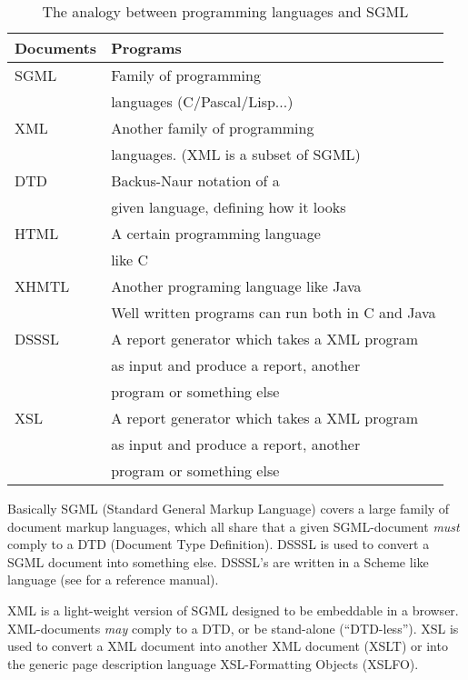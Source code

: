 \begin{table}[htbp]
  \begin{center}
    \begin{tabular}{|l|l|}
      \hline\hline
      \textbf{Documents} &  \textbf{Programs} \\
      \hline
      SGML &Family of programming \\
           & languages  (C/Pascal/Lisp...) \\
      \hline
      XML  & Another family of programming \\
           & languages. (XML is a subset of SGML) \\
      \hline
      DTD  & \textsf{Backus}-Naur notation of a \\
           & given language, defining how it looks\\
      \hline
      HTML & A certain programming language\\
           & like C \\
      \hline
      XHMTL & Another programing language like Java \\
           & Well written programs can run both in C and Java\\
      \hline
      DSSSL & A report generator which takes a XML program \\
           & as input and produce a report, another\\
           & program or something else \\
      \hline
      XSL  & A report generator which takes a XML program \\
           & as input and produce a report, another\\
           & program or something else \\
      \hline
    \end{tabular}
    \caption{The analogy between programming languages and SGML}
    \label{tab:programming-langugages-and-html}
  \end{center}
\end{table}

Basically SGML (Standard General Markup Language) covers a large
family of document markup languages, which all share that a given
SGML-document \textit{must} comply to a DTD (Document Type
Definition).  DSSSL is used to convert a SGML document into something
else.  DSSSL's are written in a Scheme like language (see
\cite{Dybvig:1996:SPL} for a reference manual).

XML is a light-weight version of SGML designed to be embeddable in a
browser.  XML-documents \textit{may} comply to a DTD, or be
stand-alone (``DTD-less'').  XSL is used to convert a XML document
into another XML document (XSLT) or into the generic page description
language XSL-Formatting Objects (XSLFO).

